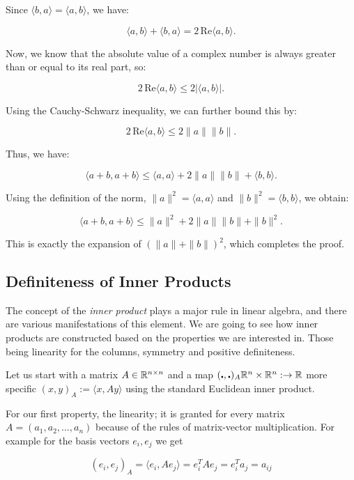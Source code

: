 Since \( \langle b, a \rangle = \langle a, b \rangle \), we have:

\[
    \langle a, b \rangle + \langle b, a \rangle = 2 \, \text{Re} \langle a, b \rangle.
\]

Now, we know that the absolute value of a complex number is always greater than or equal to its 
real part, so:

\[
    2 \, \text{Re} \langle a, b \rangle \leq 2 |\langle a, b \rangle|.
\]

Using the Cauchy-Schwarz inequality, we can further bound this by:

\[
    2 \, \text{Re} \langle a, b \rangle \leq 2 \|a\| \|b\|.
\]

Thus, we have:

\[
    \langle a + b, a + b \rangle \leq \langle a, a \rangle + 2 \|a\| \|b\| + \langle b, b \rangle.
\]

Using the definition of the norm, \( \|a\|^2 = \langle a, a \rangle \) and \( \|b\|^2 = \langle b, b 
\rangle \), we obtain:

\[
    \langle a + b, a + b \rangle \leq \|a\|^2 + 2 \|a\| \|b\| + \|b\|^2.
\]

This is exactly the expansion of \( {(\|a\| + \|b\|)}^2 \), which completes the proof.

\QED

\subsection{Definiteness of Inner Products}

The concept of the \emph{inner product} plays a major rule in linear algebra, and there are various 
manifestations of this element. We are going to see how inner products are constructed based on the 
properties we are interested in. Those being linearity for the columns, symmetry and positive definiteness.

Let us start with a matrix \(A \in \mathbb{R}^{n \times n}\) and a map 
\((\centerdot , \centerdot)_A \mathbb{R}^n \times \mathbb{R}^n : \to \mathbb{R} \) more specific 
\((x,y)_A := \langle x, Ay\rangle\) using the standard Euclidean inner product.

For our first property, the linearity; it is granted for every matrix \(A = (a_1, a_2, \dots, a_n)\) 
because of the rules of matrix-vector multiplication. For example for the basis vectors \(e_i, e_j\) 
we get 

\[
    (e_i, e_j)_A = \langle e_i, Ae_j\rangle = e_{i}^{T} A e_j = e_{i}^{T} a_j = a_{ij} 
\]

